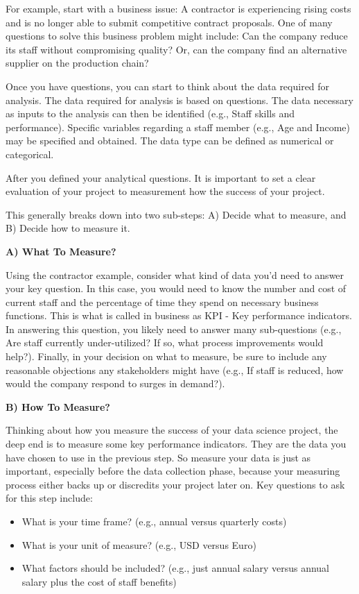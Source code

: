 \documentclass[
]{book}
\providecommand{\tightlist}{%
  \setlength{\itemsep}{0pt}\setlength{\parskip}{0pt}}
\begin{document}
For example, start with a business issue: A contractor is experiencing rising costs and is no longer able to submit competitive contract proposals. One of many questions to solve this business problem might include: Can the company reduce its staff without compromising quality? Or, can the company find an alternative supplier on the production chain?

Once you have questions, you can start to think about the data required for analysis. The data required for analysis is based on questions. The data necessary as inputs to the analysis can then be identified (e.g., Staff skills and performance). Specific variables regarding a staff member (e.g., Age and Income) may be specified and obtained. The data type can be defined as numerical or categorical.

After you defined your analytical questions. It is important to set a clear evaluation of your project to measurement how the success of your project.

This generally breaks down into two sub-steps: A) Decide what to measure, and B) Decide how to measure it.

\textbf{A) What To Measure?}

Using the contractor example, consider what kind of data you'd need to answer your key question. In this case, you would need to know the number and cost of current staff and the percentage of time they spend on necessary business functions. This is what is called in business as KPI - Key performance indicators. In answering this question, you likely need to answer many sub-questions (e.g., Are staff currently under-utilized? If so, what process improvements would help?). Finally, in your decision on what to measure, be sure to include any reasonable objections any stakeholders might have (e.g., If staff is reduced, how would the company respond to surges in demand?).

\textbf{B) How To Measure? }

Thinking about how you measure the success of your data science project, the deep end is to measure some key performance indicators. They are the data you have chosen to use in the previous step. So measure your data is just as important, especially before the data collection phase, because your measuring process either backs up or discredits your project later on. Key questions to ask for this step include:

\begin{itemize}
\tightlist
\item
  What is your time frame? (e.g., annual versus quarterly costs)
\item
  What is your unit of measure? (e.g., USD versus Euro)
\item
  What factors should be included? (e.g., just annual salary versus annual salary plus the cost of staff benefits)
\end{itemize}
\end{document}
